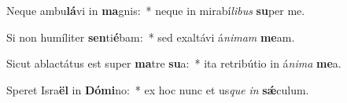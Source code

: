 \item Neque ambu\textbf{lá}vi in \textbf{ma}gnis:~* neque in mirabí\textit{li}\textit{bus} \textbf{su}per me.
\item Si non humíliter \textbf{sen}ti\textbf{é}bam:~* sed exaltávi á\textit{ni}\textit{mam} \textbf{me}am.
\item Sicut ablactátus est super \textbf{ma}tre \textbf{su}a:~* ita retribútio in á\textit{ni}\textit{ma} \textbf{me}a.
\item Speret Isra\textbf{ël} in \textbf{Dó}\textbf{mi}no:~* ex hoc nunc et us\textit{que} \textit{in} \textbf{sǽ}culum.
